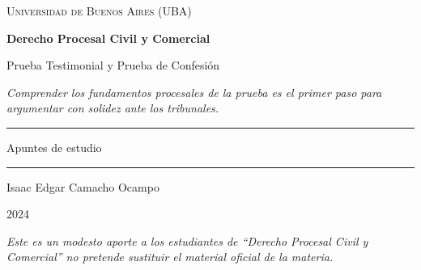 \documentclass[12pt,oneside]{book}
\newcommand{\universidad}{Universidad de Buenos Aires (UBA)}
\newcommand{\materia}{Derecho Procesal Civil y Comercial}
\newcommand{\titulo}{Prueba Testimonial y Prueba de Confesión}
\newcommand{\autor}{Isaac Edgar Camacho Ocampo}
\newcommand{\anio}{2024}
\newcommand{\reflexionportada}{Comprender los fundamentos procesales de la prueba es el primer paso para argumentar con solidez ante los tribunales.}
\begin{document}
\begin{titlepage}

\thispagestyle{empty}

\begin{center}

\vspace*{1cm}

{\large \textsc{\universidad}}

\vspace{3cm}

{\Huge \textbf{\materia}}

\vspace{1cm}

{\LARGE \titulo}

\vspace{0.8cm}

\textit{\reflexionportada}

\vspace{1.2cm}

\rule{0.70\textwidth}{0.5pt}

\vspace{0.5cm}

{\large Apuntes de estudio}

\vspace{0.5cm}

\rule{0.70\textwidth}{0.5pt}

\vfill

{\large \autor}

\vspace{0.3cm}

{\large \anio}

\end{center}

\vfill

\begin{flushleft}
\textit{Este es un modesto aporte a los estudiantes de ``\materia'' no pretende sustituir el material oficial de la materia.}
\end{flushleft}

\end{titlepage}

\tableofcontents

\end{document}
